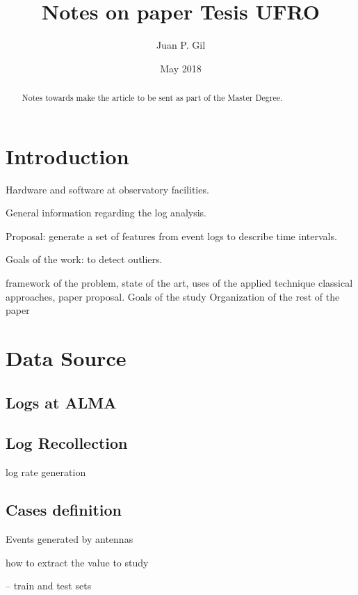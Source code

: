 \documentclass{article}
\title{Notes on paper Tesis UFRO}
\author{Juan P. Gil }
\date{May 2018}
\begin{document}
\maketitle

\begin{abstract}
Notes towards make the article to be sent as part of the Master Degree.
\end{abstract}




\section{Introduction}

Hardware and software at observatory facilities.

General information regarding the log analysis.

Proposal: generate a set of features from event logs to describe time intervals.

Goals of the work: to detect outliers.

framework of the problem, state of the art, uses of the applied technique
classical approaches, paper proposal. Goals of the study
Organization of the rest of the paper


\section{Data Source}


\subsection{Logs at ALMA}

\subsection{Log Recollection}

log rate generation


\subsection{Cases definition}
Events generated by antennas

how to extract the value to study

-- train and test sets
\end{document}
